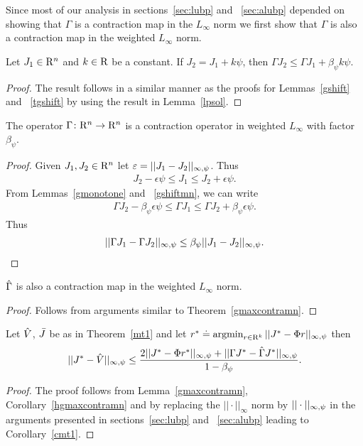 Since most of our analysis in sections~\ref{sec:lubp} and ~\ref{sec:alubp} depended on showing that $\Gamma$ is a contraction map in the $L_\infty$ norm we first show that $\Gamma$ is also a contraction map in the weighted $L_\infty$ norm.
\begin{lemma}\label{gshiftmn}
Let $J_1\in \mathrm{R}^n$ and $k\in \mathrm{R}$ be a constant. If $J_2=J_1+k\psi$, then $\Gamma J_2\leq \Gamma J_1+\beta_{\psi} k\psi$.
\end{lemma}
\begin{proof}
The result follows in a similar manner as the proofs for Lemmas~\ref{gshift} and ~\ref{tgshift} by using the result in Lemma~\ref{lpsol}.
\end{proof}
\begin{theorem}\label{gmaxcontramn}
The operator $\Gamma  \colon \mathrm{R}^n\rightarrow \mathrm{R}^n$ is a contraction operator in weighted $L_\infty$ with factor $\beta_{\psi}$.
\end{theorem}
\begin{proof}
Given $J_1,J_2\in \mathrm{R}^n$ let $\varepsilon=||J_1-J_2||_{\infty,\psi}$. Thus
\begin{align}\label{ineq}
J_2-\epsilon\psi\leq J_1\leq J_2+\epsilon \psi.
\end{align}
From Lemmas~\ref{gmonotone} and ~\ref{gshiftmn}, we can write
\begin{align}\label{ineq}
\Gamma J_2-\beta_{\psi} \epsilon\psi\leq \Gamma J_1\leq \Gamma J_2+\beta_{\psi} \epsilon\psi.
\end{align}
Thus
\begin{align}
||\Gamma J_1-\Gamma J_2||_{\infty,\psi}\leq \beta_{\psi} ||J_1-J_2||_{\infty,\psi}.
\end{align}
\end{proof}
\begin{corollary}\label{hgmaxcontramn}
$\hat{\Gamma}$ is also a contraction map in the weighted $L_\infty$ norm.
\end{corollary}
\begin{proof}
Follows from arguments similar to Theorem~\ref{gmaxcontramn}.
\end{proof}
\begin{lemma}\label{cmt1mn}
Let $\hat{V}$, $\bar{J}$ be as in Theorem~\ref{mt1} and let $r^*\doteq\operatorname{argmin}_{r\in \mathrm{R}^k}||J^*-\Phi r||_{\infty,\psi}$ then
\begin{align}
||J^*-\hat{V}||_{\infty,\psi}\leq \frac{2||J^*-\Phi r^*||_{\infty,\psi}+||\Gamma J^*-\hat{\Gamma} J^*||_{\infty,\psi}}{1-\beta_{\psi}}.
\end{align}
\end{lemma}
\begin{proof}
The proof follows from Lemma~\ref{gmaxcontramn}, Corollary~\ref{hgmaxcontramn} and by replacing the $||\cdot||_\infty$ norm by $||\cdot||_{\infty,\psi}$ in the arguments presented in sections~\ref{sec:lubp} and ~\ref{sec:alubp} leading to Corollary~\ref{cmt1}.
\end{proof}

